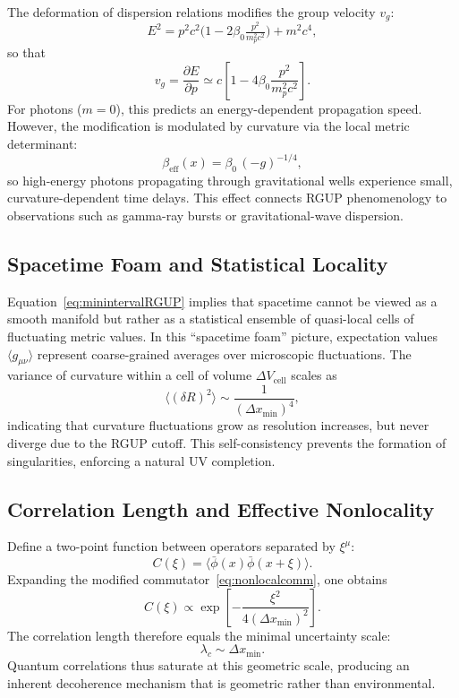 \documentclass[11pt,oneside]{book}
\numberwithin{equation}{chapter}
\begin{document}
The deformation of dispersion relations modifies the group velocity \(v_g\):
\begin{equation}
E^2 = p^2 c^2 \big(1 - 2\beta_0 \tfrac{p^2}{m_p^2 c^2}\big) + m^2 c^4,
\end{equation}
so that
\begin{equation}
v_g = \frac{\partial E}{\partial p}
\simeq 
c\!\left[1 - 4\beta_0\frac{p^2}{m_p^2 c^2}\right].
\label{eq:groupvelocity}
\end{equation}
For photons ($m=0$), this predicts an energy-dependent propagation speed.  
However, the modification is modulated by curvature via the local metric determinant:
\begin{equation}
\beta_{\text{eff}}(x)
= \beta_0\,(-g)^{-1/4},
\end{equation}
so high-energy photons propagating through gravitational wells experience small, curvature-dependent time delays.  
This effect connects RGUP phenomenology to observations such as gamma-ray bursts or gravitational-wave dispersion.

\subsection*{Spacetime Foam and Statistical Locality}

Equation~\eqref{eq:minintervalRGUP} implies that spacetime cannot be viewed as a smooth manifold but rather as a statistical ensemble of quasi-local cells of fluctuating metric values.  
In this “spacetime foam” picture, expectation values $\langle g_{\mu\nu}\rangle$ represent coarse-grained averages over microscopic fluctuations.  
The variance of curvature within a cell of volume $\Delta V_{\text{cell}}$ scales as
\begin{equation}
\langle (\delta R)^2 \rangle
\sim
\frac{1}{(\Delta x_{\min})^4},
\end{equation}
indicating that curvature fluctuations grow as resolution increases, but never diverge due to the RGUP cutoff.  
This self-consistency prevents the formation of singularities, enforcing a natural UV completion.

\subsection*{Correlation Length and Effective Nonlocality}

Define a two-point function between operators separated by $\xi^\mu$:
\begin{equation}
C(\xi) = \langle \bar{\phi}(x)\bar{\phi}(x+\xi)\rangle.
\end{equation}
Expanding the modified commutator~\eqref{eq:nonlocalcomm}, one obtains
\begin{equation}
C(\xi) \propto
\exp\!\left[
-\frac{\xi^2}{4(\Delta x_{\min})^2}
\right].
\end{equation}
The correlation length therefore equals the minimal uncertainty scale:
\begin{equation}
\lambda_c \sim \Delta x_{\min}.
\end{equation}
Quantum correlations thus saturate at this geometric scale, producing an inherent decoherence mechanism that is geometric rather than environmental.  
\end{document}
